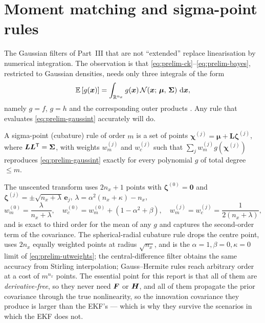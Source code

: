 \section{Moment matching and sigma-point rules}
\label{sec:prelim-sigma}

The Gaussian filters of Part~III that are not ``extended'' replace linearisation by numerical
integration. The observation is that \eqref{eq:prelim-ck}--\eqref{eq:prelim-bayes}, restricted to
Gaussian densities, needs only three integrals of the form
\begin{equation}
\mathbb{E}\left[g(\bm{x})\right] = \int_{\mathbb{R}^{n_x}} g(\bm{x})\,\mathcal{N}\!\left(\bm{x};\,\bm\mu,\,\bm\Sigma\right)\,\mathrm{d}\bm{x} ,
\label{eq:prelim-gaussint}
\end{equation}
namely $g = f$, $g = h$ and the corresponding outer products \cite{ito2000gaussian}. Any rule
that evaluates \eqref{eq:prelim-gaussint} accurately will do.

\begin{definition}\label{def:prelim-sigma}
A sigma-point (cubature) rule of order $m$ is a set of points
$\bm{\chi}^{(j)} = \bm\mu + \bm{L}\bm{\zeta}^{(j)}$, where $\bm{L}\bm{L}^{\mathsf{T}} = \bm\Sigma$, with
weights $w_m^{(j)}$ and $w_c^{(j)}$ such that
$\sum_j w_m^{(j)} g(\bm\chi^{(j)})$ reproduces \eqref{eq:prelim-gaussint} exactly for every
polynomial $g$ of total degree $\le m$.
\end{definition}

The unscented transform \cite{julier2000newmethod,julier2004unscented,wan2000ukf} uses
$2n_x+1$ points with $\bm\zeta^{(0)}=\bm0$ and
$\bm\zeta^{(j)}=\pm\sqrt{n_x+\lambda}\,\bm{e}_j$, $\lambda = \alpha^2(n_x+\kappa)-n_x$,
\begin{equation}
w_m^{(0)} = \frac{\lambda}{n_x+\lambda},\quad
w_c^{(0)} = w_m^{(0)} + (1-\alpha^2+\beta),\quad
w_m^{(j)} = w_c^{(j)} = \frac{1}{2(n_x+\lambda)},
\label{eq:prelim-utweights}
\end{equation}
and is exact to third order for the mean of any $g$ and captures the second-order term of the
covariance. The spherical-radial cubature rule \cite{arasaratnam2009ckf} drops the centre point,
uses $2n_x$ equally weighted points at radius $\sqrt{n_x}$, and is the $\alpha=1,\beta=0,\kappa=0$
limit of \eqref{eq:prelim-utweights}; the central-difference filter \cite{norgaard2000} obtains
the same accuracy from Stirling interpolation; Gauss--Hermite rules reach arbitrary order at a
cost of $m^{n_x}$ points. The essential point for this report is that all of them are
\emph{derivative-free}, so they never need $\bm{F}$ or $\bm{H}$, and all of them propagate the prior
covariance through the true nonlinearity, so the innovation covariance they produce is larger
than the EKF's --- which is why they survive the scenarios in which the EKF does not.

